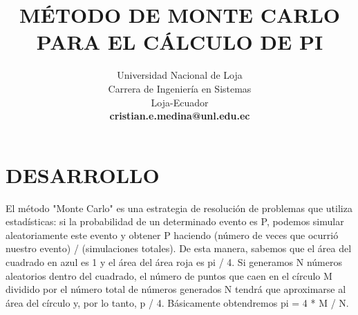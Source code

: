 \documentclass[letterpaper, 10 pt, conference]{ieeeconf}
\title{\LARGE \bf
MÉTODO DE MONTE CARLO PARA EL CÁLCULO DE PI
}
\author{Universidad Nacional de Loja
\\
Carrera de Ingeniería en Sistemas
\\
Loja-Ecuador
\\
\textbf{cristian.e.medina@unl.edu.ec}
}
\begin{document}
\maketitle





\section{\textbf{DESARROLLO}}
    El método "Monte Carlo" es una estrategia de resolución de problemas que utiliza estadísticas: si la probabilidad de un determinado evento es P, podemos simular aleatoriamente este evento y obtener P haciendo (número de veces que ocurrió nuestro evento) / (simulaciones totales)\cite{metodomontecarlo}.
    \newline
    \newline
    De esta manera, sabemos que el área del cuadrado en azul es 1 y el área del área roja es pi / 4. Si generamos N números aleatorios dentro del cuadrado, el número de puntos que caen en el círculo M dividido por el número total de números generados N tendrá que aproximarse al área del círculo y, por lo tanto, p / 4.
Básicamente obtendremos pi = 4 * M / N.
\end{document}
